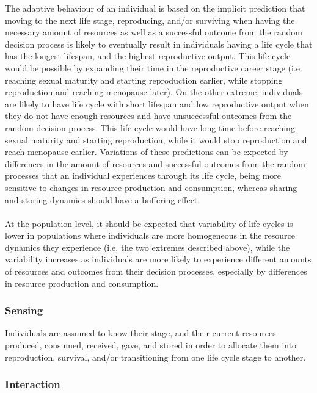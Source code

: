 \documentclass{article}
\begin{document}
The adaptive behaviour of an individual is based on the implicit prediction that moving to the next life stage, reproducing, and/or surviving when having the necessary amount of resources as well as a successful outcome from the random decision process is likely to eventually result in individuals having a life cycle that has the longest lifespan, and the highest reproductive output. This life cycle would be possible by expanding their time in the reproductive career stage (i.e. reaching sexual maturity and starting reproduction earlier, while stopping reproduction and reaching menopause later). On the other extreme, individuals are likely to have life cycle with short lifespan and low reproductive output when they do not have enough resources and have unsuccessful outcomes from the random decision process. This life cycle would have long time before reaching sexual maturity and starting reproduction, while it would stop reproduction and reach menopause earlier. Variations of these predictions can be expected by differences in the amount of resources and successful outcomes from the random processes that an individual experiences through its life cycle, being more sensitive to changes in resource production and consumption, whereas sharing and storing dynamics should have a buffering effect.
\\\\
At the population level, it should be expected that variability of life cycles is lower in populations where individuals are more homogeneous in the resource dynamics they experience (i.e. the two extremes described above), while the variability increases as individuals are more likely to experience different amounts of resources and outcomes from their decision processes, especially by differences in resource production and consumption.

\subsubsection{Sensing}

Individuals are assumed to know their stage, and their current resources produced, consumed, received, gave, and stored in order to allocate them into reproduction, survival, and/or transitioning from one life cycle stage to another.

\subsubsection{Interaction}
\end{document}
